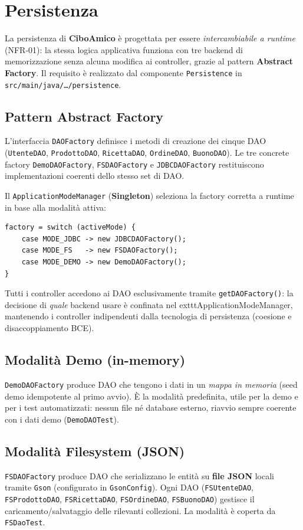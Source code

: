 \chapter{Persistenza}
\label{cap:persistenza}

La persistenza di \textbf{CiboAmico} è progettata per essere
\emph{intercambiabile a runtime} (NFR-01): la stessa logica applicativa
funziona con tre backend di memorizzazione senza alcuna modifica ai
controller, grazie al pattern \textbf{Abstract Factory}. Il requisito è
realizzato dal componente \texttt{Persistence} in
\texttt{src/main/java/\ldots/persistence}.

\section{Pattern Abstract Factory}
L'interfaccia \texttt{DAOFactory} definisce i metodi di creazione dei cinque
DAO (\texttt{UtenteDAO}, \texttt{ProdottoDAO}, \texttt{RicettaDAO},
\texttt{OrdineDAO}, \texttt{BuonoDAO}). Le tre concrete factory
\texttt{DemoDAOFactory}, \texttt{FSDAOFactory} e \texttt{JDBCDAOFactory}
restituiscono implementazioni coerenti dello stesso set di DAO.

Il \texttt{ApplicationModeManager} (\textbf{Singleton}) seleziona la factory
corretta a runtime in base alla modalità attiva:
\begin{verbatim}
factory = switch (activeMode) {
    case MODE_JDBC -> new JDBCDAOFactory();
    case MODE_FS   -> new FSDAOFactory();
    case MODE_DEMO -> new DemoDAOFactory();
}
\end{verbatim}
Tutti i controller accedono ai DAO esclusivamente tramite
\texttt{getDAOFactory()}: la decisione di \emph{quale} backend usare è
confinata nel 	exttt{ApplicationModeManager}, mantenendo i controller
indipendenti dalla tecnologia di persistenza (coesione e disaccoppiamento BCE).

\section{Modalità Demo (in-memory)}
\texttt{DemoDAOFactory} produce DAO che tengono i dati in un \emph{mappa in
memoria} (seed demo idempotente al primo avvio). È la modalità predefinita,
utile per la demo e per i test automatizzati: nessun file né database
esterno, riavvio sempre coerente con i dati demo (\texttt{DemoDAOTest}).

\section{Modalità Filesystem (JSON)}
\texttt{FSDAOFactory} produce DAO che serializzano le entità su \textbf{file
JSON} locali tramite \texttt{Gson} (configurato in \texttt{GsonConfig}).
Ogni DAO (\texttt{FSUtenteDAO}, \texttt{FSProdottoDAO}, \texttt{FSRicettaDAO},
\texttt{FSOrdineDAO}, \texttt{FSBuonoDAO}) gestisce il caricamento/salvataggio
delle rilevanti collezioni. La modalità è coperta da \texttt{FSDaoTest}.

